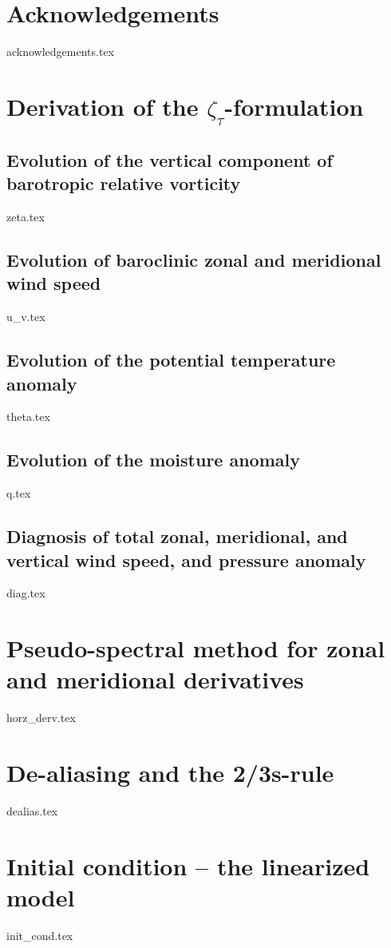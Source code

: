 \documentclass[letterpaper, 12pt]{article}
\begin{document}
\section*{Acknowledgements}
	{acknowledgements.tex}
    
\newpage
    
\clearpage
{}



\newpage

\appendix

\section{Derivation of the $\zeta_{\tau}$-formulation} \label{appendix:zeta_tau_form_deriv}

	\subsection{Evolution of the vertical component of barotropic relative vorticity} \label{subsection:zeta}
		{zeta.tex}
		
	\subsection{Evolution of baroclinic zonal and meridional wind speed} \label{subsection:u_v}
		{u_v.tex}
		
	\subsection{Evolution of the potential temperature anomaly} \label{subsection:theta}
		{theta.tex}
		
	\subsection{Evolution of the moisture anomaly} \label{subsection:q}
		{q.tex}
		
	\subsection{Diagnosis of total zonal, meridional, and vertical wind speed, and pressure anomaly} \label{subsubsection:diag}
		{diag.tex}


\section{Pseudo-spectral method for zonal and meridional derivatives} \label{appendix:horz_derv}
	{horz_derv.tex}

\section{De-aliasing and the 2/3s-rule} \label{appendix:dealias}
	{dealias.tex}

\section{Initial condition -- the linearized model} \label{appendix:linear_model}
	{init_cond.tex}
\end{document}
